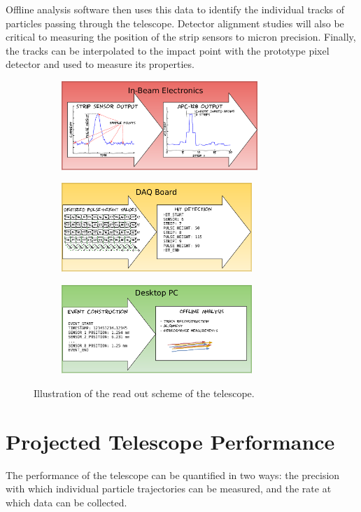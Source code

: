 \documentclass{PoS}
\begin{document}
Offline analysis software then uses this data to identify the individual tracks
of particles passing through the telescope. Detector alignment studies will
also be critical to measuring the position of the strip sensors to micron
precision. Finally, the tracks can be interpolated to the impact point with the
prototype pixel detector and used to measure its properties.
\begin{figure}[h]
  \centering
  \begin{subfigure}[b]{0.49\textwidth}
    \includegraphics[height=1.32in]{../figures/Telescope_Data_Flow_Stage_I.pdf}
  \end{subfigure}
  \begin{subfigure}[b]{0.49\textwidth}
    \includegraphics[height=1.32in]{../figures/Telescope_Data_Flow_Stage_II.pdf}
  \end{subfigure}
  \begin{subfigure}[b]{0.49\textwidth}
    \includegraphics[height=1.32in]{../figures/Telescope_Data_Flow_Stage_III.pdf}
  \end{subfigure}
  \caption{Illustration of the read out scheme of the telescope.}
\label{fig:readout}
\end{figure}


\section{Projected Telescope Performance}
The performance of the telescope can be quantified in two ways: the
precision with which individual particle trajectories can be measured, and
the rate at which data can be collected. 
\end{document}
